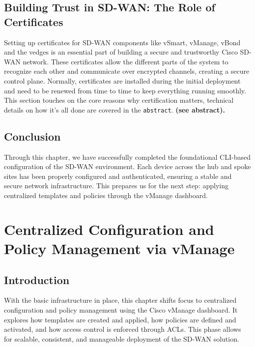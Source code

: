 \documentclass[12pt,english]{report}
\begin{document}
\section{Building Trust in SD-WAN: The Role of Certificates}
Setting up certificates for SD-WAN components like vSmart, vManage, vBond and the vedges is an essential part of building a secure and trustworthy Cisco SD-WAN network. These certificates allow the different parts of the system to recognize each other and communicate over encrypted channels, creating a secure control plane. Normally, certificates are installed during the initial deployment and need to be renewed from time to time to keep everything running smoothly. This section touches on the core reasons why certification matters, technical details on how it’s all done are covered in the \texttt{abstract}.
\textbf{(see abstract).}

\section{Conclusion}
Through this chapter, we have successfully completed the foundational CLI-based configuration of the SD-WAN environment. Each device across the hub and spoke sites has been properly configured and authenticated, ensuring a stable and secure network infrastructure. This prepares us for the next step: applying centralized templates and policies through the vManage dashboard.

\chapter{Centralized Configuration and Policy Management via vManage}
\section{Introduction}
With the basic infrastructure in place, this chapter shifts focus to centralized configuration and policy management using the Cisco vManage dashboard. It explores how templates are created and applied, how policies are defined and activated, and how access control is enforced through ACLs. This phase allows for scalable, consistent, and manageable deployment of the SD-WAN solution.
\end{document}
